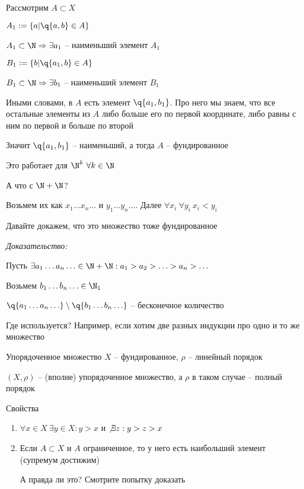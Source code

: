 \documentclass[12pt]{article}
\begin{document}
Рассмотрим $A \subset X$

$A_1 := \{ a | \q{a, b} \in A \}$

$A_1 \subset \N \Rightarrow \exists a_1$ -- наименьший элемент $A_1$

$B_1 := \{b | \q{a_1, b} \in A\}$

$B_1 \subset \N \Rightarrow \exists b_1$ -- наименьший элемент $B_1$

Иными словами, в $A$ есть элемент $\q{a_1, b_1}$. Про него мы знаем, что все остальные элементы из $A$ либо больше его по первой координате, либо равны с ним по первой и больше по второй

Значит $\q{a_1, b_1}$ -- наименьший, а тогда $A$ -- фундированное

\begin{Remark}{}
    Это работает для $\N^k\ \forall k \in \N$
\end{Remark}

\begin{theo}{}
    А что с $\N + \N$?

    Возьмем их как $x_1 \ldots x_n \ldots$ и $y_1 \ldots y_n \ldots$. Далее $\forall x_i\ \forall y_i\ x_i < y_i$

    Давайте докажем, что это множество тоже фундированное
\end{theo}

\textit{Доказательство:}

Пусть $\exists a_1 \ldots a_n \ldots \in \N + \N : a_1 > a_2 > \ldots > a_n > \ldots$

Возьмем $b_1 \ldots b_n \ldots \in \N_1$

$\q{a_1 \ldots a_n \ldots} \setminus \q{b_1 \ldots b_n \ldots}$ -- бесконечное количество 

\begin{Example}{Где используется?}
    Например, если хотим две разных индукции про одно и то же множество
\end{Example}

\begin{defin}{Упорядоченное множество}
    $X$ -- фундированное, $\rho$ -- линейный порядок

    $(X, \rho)$ -- (вполне) упорядоченное множество, а $\rho$ в таком случае -- полный порядок
\end{defin}

\begin{theo}{Свойства}
    \begin{enumerate}
        \item $\forall x \in X\ \exists y \in X : y > x$ и $\not\exists z : y > z > x$
        \item Если $A \subset X$ и $A$ ограниченное, то у него есть наибольший элемент (супремум достижим)
        
        А правда ли это? Смотрите попытку доказать
    \end{enumerate}
\end{theo}
\end{document}
